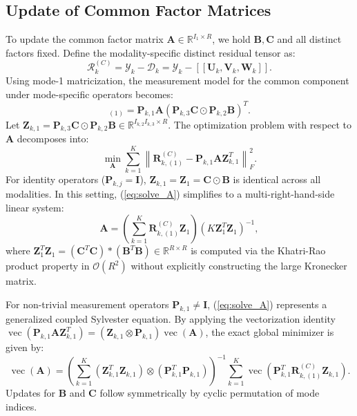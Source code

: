\documentclass[11pt,a4paper]{article}
\begin{document}
\subsection{Update of Common Factor Matrices}
To update the common factor matrix $\mathbf{A} \in \mathbb{R}^{I_1 \times R}$, we hold $\mathbf{B}, \mathbf{C}$ and all distinct factors fixed. Define the modality-specific distinct residual tensor as:
\begin{equation}
\bm{\mathcal{R}}_k^{(C)} = \bm{\mathcal{Y}}_k - \bm{\mathcal{D}}_k = \bm{\mathcal{Y}}_k - [\![\mathbf{U}_k, \mathbf{V}_k, \mathbf{W}_k]\!].
\end{equation}
Using mode-1 matricization, the measurement model for the common component under mode-specific operators becomes:
\begin{equation}
[\bm{\mathcal{P}}_k(\bm{\mathcal{C}})]_{(1)} = \mathbf{P}_{k,1} \mathbf{A} \left( \mathbf{P}_{k,3} \mathbf{C} \odot \mathbf{P}_{k,2} \mathbf{B} \right)^T.
\end{equation}
Let $\mathbf{Z}_{k,1} = \mathbf{P}_{k,3} \mathbf{C} \odot \mathbf{P}_{k,2} \mathbf{B} \in \mathbb{R}^{I_{k,2} I_{k,3} \times R}$. The optimization problem with respect to $\mathbf{A}$ decomposes into:
\begin{equation}
\min_{\mathbf{A}} \sum_{k=1}^K \left\| \mathbf{R}_{k,(1)}^{(C)} - \mathbf{P}_{k,1} \mathbf{A} \mathbf{Z}_{k,1}^T \right\|_F^2.
\label{eq:solve_A}
\end{equation}
For identity operators ($\mathbf{P}_{k,j} = \mathbf{I}$), $\mathbf{Z}_{k,1} = \mathbf{Z}_1 = \mathbf{C} \odot \mathbf{B}$ is identical across all modalities. In this setting, (\ref{eq:solve_A}) simplifies to a multi-right-hand-side linear system:
\begin{equation}
\mathbf{A} = \left( \sum_{k=1}^K \mathbf{R}_{k,(1)}^{(C)} \mathbf{Z}_1 \right) \left( K \mathbf{Z}_1^T \mathbf{Z}_1 \right)^{-1},
\label{eq:update_A_closed}
\end{equation}
where $\mathbf{Z}_1^T \mathbf{Z}_1 = (\mathbf{C}^T \mathbf{C}) * (\mathbf{B}^T \mathbf{B}) \in \mathbb{R}^{R \times R}$ is computed via the Khatri-Rao product property in $\mathcal{O}(R^2)$ without explicitly constructing the large Kronecker matrix.

For non-trivial measurement operators $\mathbf{P}_{k,1} \ne \mathbf{I}$, (\ref{eq:solve_A}) represents a generalized coupled Sylvester equation. By applying the vectorization identity $\operatorname{vec}(\mathbf{P}_{k,1} \mathbf{A} \mathbf{Z}_{k,1}^T) = (\mathbf{Z}_{k,1} \otimes \mathbf{P}_{k,1}) \operatorname{vec}(\mathbf{A})$, the exact global minimizer is given by:
\begin{equation}
\operatorname{vec}(\mathbf{A}) = \left( \sum_{k=1}^K (\mathbf{Z}_{k,1}^T \mathbf{Z}_{k,1}) \otimes (\mathbf{P}_{k,1}^T \mathbf{P}_{k,1}) \right)^{-1} \sum_{k=1}^K \operatorname{vec}\left( \mathbf{P}_{k,1}^T \mathbf{R}_{k,(1)}^{(C)} \mathbf{Z}_{k,1} \right).
\label{eq:exact_sylvester}
\end{equation}
Updates for $\mathbf{B}$ and $\mathbf{C}$ follow symmetrically by cyclic permutation of mode indices.
\end{document}
